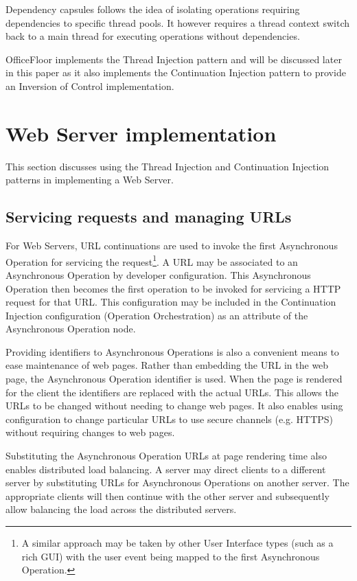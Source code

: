 \documentclass[prodmode]{style/acmlarge}
\begin{document}
Dependency capsules \cite{dependency-capsules} follows the idea of isolating
operations requiring dependencies to specific thread pools.  It however requires
a thread context switch back to a main thread for executing operations without
dependencies.

OfficeFloor \cite{officefloor} implements the Thread Injection pattern and will
be discussed later in this paper as it also implements the Continuation
Injection pattern to provide an Inversion of Control implementation.




\section{Web Server implementation}

This section discusses using the Thread Injection and Continuation Injection
patterns in implementing a Web Server.


\subsection{Servicing requests and managing URLs}

For Web Servers, URL continuations \cite{url-continuation} are used to invoke
the first Asynchronous Operation for servicing the request\footnote{A similar
approach may be taken by other User Interface types (such as a rich GUI) with
the user event being mapped to the first Asynchronous Operation.}.  A URL may be
associated to an Asynchronous Operation by developer configuration.  This
Asynchronous Operation then becomes the first operation to be invoked for
servicing a HTTP request for that URL.  This configuration may be included in
the Continuation Injection configuration (Operation Orchestration) as an
attribute of the Asynchronous Operation node.

Providing identifiers to Asynchronous Operations is also a convenient means to
ease maintenance of web pages.  Rather than embedding the URL in the web page,
the Asynchronous Operation identifier is used.  When the page is rendered for
the client the identifiers are replaced with the actual URLs.  This allows the
URLs to be changed without needing to change web pages.  It also enables using
configuration to change particular URLs to use secure channels (e.g. HTTPS)
without requiring changes to web pages.

Substituting the Asynchronous Operation URLs at page rendering time also enables
distributed load balancing.  A server may direct clients to a different server
by substituting URLs for Asynchronous Operations on another server. The
appropriate clients will then continue with the other server and subsequently
allow balancing the load across the distributed servers.
\end{document}
